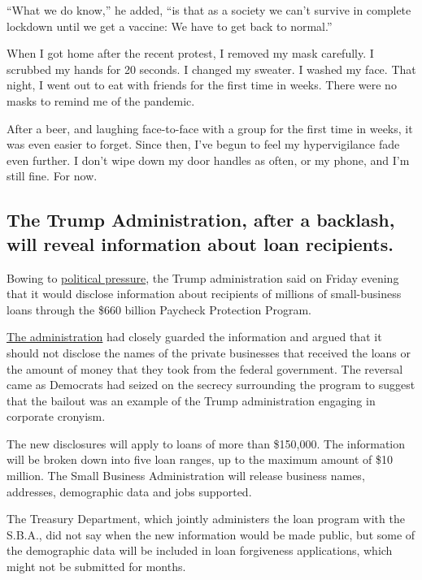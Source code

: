 ``What we do know,'' he added, ``is that as a society we can't survive
in complete lockdown until we get a vaccine: We have to get back to
normal.''

When I got home after the recent protest, I removed my mask carefully. I
scrubbed my hands for 20 seconds. I changed my sweater. I washed my
face. That night, I went out to eat with friends for the first time in
weeks. There were no masks to remind me of the pandemic.

After a beer, and laughing face-to-face with a group for the first time
in weeks, it was even easier to forget. Since then, I've begun to feel
my hypervigilance fade even further. I don't wipe down my door handles
as often, or my phone, and I'm still fine. For now.

\hypertarget{the-trump-administration-after-a-backlash-will-reveal-information-about-loan-recipients}{%
\subsection{The Trump Administration, after a backlash, will reveal
information about loan
recipients.}\label{the-trump-administration-after-a-backlash-will-reveal-information-about-loan-recipients}}

Bowing to
\href{https://www.nytimes3xbfgragh.onion/2020/06/15/us/politics/coronavirus-ppp-trump-congress.html}{political
pressure}, the Trump administration said on Friday evening that it would
disclose information about recipients of millions of small-business
loans through the \$660 billion Paycheck Protection Program.

\href{https://www.nytimes3xbfgragh.onion/aponline/2020/06/13/business/bc-us-virus-outbreak-loan-transparency.html}{The
administration} had closely guarded the information and argued that it
should not disclose the names of the private businesses that received
the loans or the amount of money that they took from the federal
government. The reversal came as Democrats had seized on the secrecy
surrounding the program to suggest that the bailout was an example of
the Trump administration engaging in corporate cronyism.

The new disclosures will apply to loans of more than \$150,000. The
information will be broken down into five loan ranges, up to the maximum
amount of \$10 million. The Small Business Administration will release
business names, addresses, demographic data and jobs supported.

The Treasury Department, which jointly administers the loan program with
the S.B.A., did not say when the new information would be made public,
but some of the demographic data will be included in loan forgiveness
applications, which might not be submitted for months.


